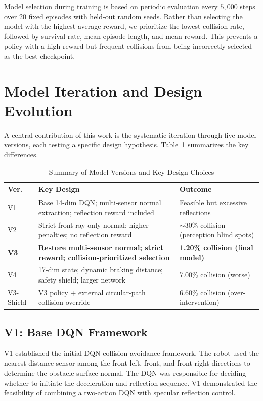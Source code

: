\documentclass[conference]{IEEEtran}
\begin{document}
Model selection during training is based on periodic evaluation every $5{,}000$ steps over 20 fixed episodes with held-out random seeds. Rather than selecting the model with the highest average reward, we prioritize the lowest collision rate, followed by survival rate, mean episode length, and mean reward. This prevents a policy with a high reward but frequent collisions from being incorrectly selected as the best checkpoint.

\section{Model Iteration and Design Evolution}

A central contribution of this work is the systematic iteration through five model versions, each testing a specific design hypothesis. Table~\ref{tab:versions} summarizes the key differences.

\begin{table}[H]
\centering
\caption{Summary of Model Versions and Key Design Choices}
\label{tab:versions}
\begin{tabular}{@{}lp{4.5cm}p{2.8cm}@{}}
\toprule
\textbf{Ver.} & \textbf{Key Design} & \textbf{Outcome} \\
\midrule
V1 & Base 14-dim DQN; multi-sensor normal extraction; reflection reward included & Feasible but excessive reflections \\
V2 & Strict front-ray-only normal; higher penalties; no reflection reward & $\sim$30\% collision (perception blind spots) \\
\textbf{V3} & \textbf{Restore multi-sensor normal; strict reward; collision-prioritized selection} & \textbf{1.20\% collision (final model)} \\
V4 & 17-dim state; dynamic braking distance; safety shield; larger network & 7.00\% collision (worse) \\
V3-Shield & V3 policy + external circular-path collision override & 6.60\% collision (over-intervention) \\
\bottomrule
\end{tabular}
\end{table}

\subsection{V1: Base DQN Framework}

V1 established the initial DQN collision avoidance framework. The robot used the nearest-distance sensor among the front-left, front, and front-right directions to determine the obstacle surface normal. The DQN was responsible for deciding whether to initiate the deceleration and reflection sequence. V1 demonstrated the feasibility of combining a two-action DQN with specular reflection control.
\end{document}
